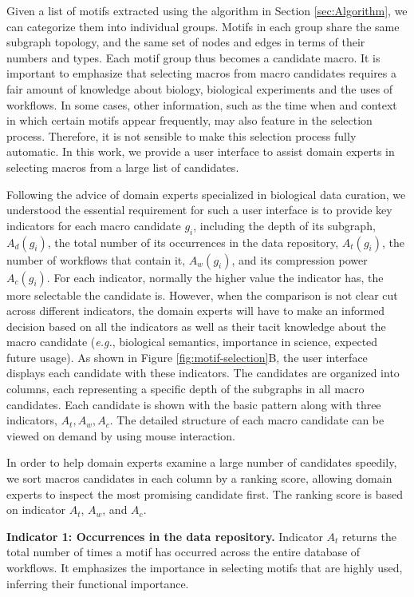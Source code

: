 Given a list of motifs extracted using the algorithm in Section \ref{sec:Algorithm}, we can categorize them into individual groups.
Motifs in each group share the same subgraph topology, and the same set of nodes and edges in terms of their numbers and types.
Each motif group thus becomes a candidate macro.
It is important to emphasize that selecting macros from macro candidates requires a fair amount of knowledge about biology, biological experiments and the uses of workflows.
In some cases, other information, such as the time when and context in which certain motifs appear frequently, may also feature in the selection process.
Therefore, it is not sensible to make this selection process fully automatic.
In this work, we provide a user interface to assist domain experts in selecting macros from a large list of candidates.

Following the advice of domain experts specialized in biological data curation, we understood the essential requirement for such a user interface is to provide key indicators for each macro candidate $g_i$, including the depth of its subgraph, $A_d(g_i)$, the total number of its occurrences in the data repository, $A_t(g_i)$, the number of workflows that contain it, $A_w(g_i)$, and its compression power $A_c(g_i)$.
For each indicator, normally the higher value the indicator has, the more selectable the candidate is.
However, when the comparison is not clear cut across different indicators, the domain experts will have to make an informed decision based on all the indicators as well as their tacit knowledge about the macro candidate (\emph{e.g.}, biological semantics, importance in science, expected future usage).
As shown in Figure \ref{fig:motif-selection}B, the user interface displays each candidate with these indicators.
The candidates are organized into columns, each representing a specific depth of the subgraphs in all macro candidates. 
Each candidate is shown with the basic pattern along with three indicators, $A_t, A_w, A_c$.
The detailed structure of each macro candidate can be viewed on demand by using mouse interaction.

In order to help domain experts examine a large number of candidates speedily, we sort macros candidates in each column by a ranking score, allowing domain experts to inspect the most promising candidate first.
The ranking score is based on indicator $A_t$, $A_w$, and $A_c$.

\noindent \textbf{Indicator 1: Occurrences in the data repository.} Indicator $A_t$ returns the total number of times a motif has occurred across the entire database of workflows.
It emphasizes the importance in selecting motifs that are highly used, inferring their functional importance. 

